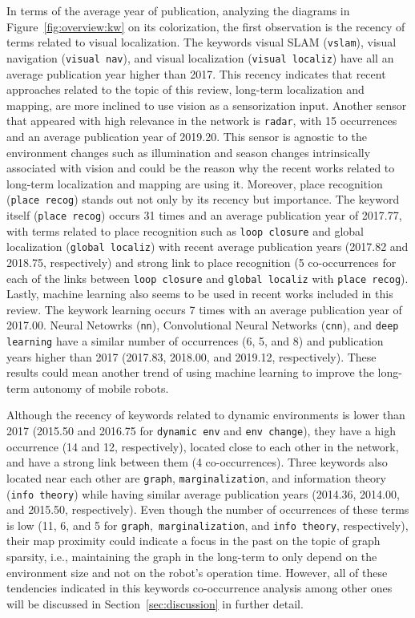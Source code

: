 In terms of the average year of publication, analyzing the diagrams in Figure~\ref{fig:overview:kw} on its colorization, the first observation is the recency of terms related to visual localization. The keywords visual SLAM (\texttt{vslam}), visual navigation (\texttt{visual nav}), and visual localization (\texttt{visual localiz}) have all an average publication year higher than 2017. This recency indicates that recent approaches related to the topic of this review, long-term localization and mapping, are more inclined to use vision as a sensorization input.
Another sensor that appeared with high relevance in the network is \texttt{radar}, with 15 occurrences and an average publication year of 2019.20. This sensor is agnostic to the environment changes such as illumination and season changes intrinsically associated with vision and could be the reason why the recent works related to long-term localization and mapping are using it.
Moreover, place recognition (\texttt{place recog}) stands out not only by its recency but importance. The keyword itself (\texttt{place recog}) occurs 31 times and an average publication year of 2017.77, with terms related to place recognition such as \texttt{loop closure} and global localization (\texttt{global localiz}) with recent average publication years (2017.82 and 2018.75, respectively) and strong link to place recognition (5 co-occurrences for each of the links between \texttt{loop closure} and \texttt{global localiz} with \texttt{place recog}). Lastly, machine learning also seems to be used in recent works included in this review. The keywork learning occurs 7 times with an average publication year of 2017.00. Neural Netowrks (\texttt{nn}), Convolutional Neural Networks (\texttt{cnn}), and \texttt{deep learning} have a similar number of occurrences (6, 5, and 8) and publication years higher than 2017 (2017.83, 2018.00, and 2019.12, respectively). These results could mean another trend of using machine learning to improve the long-term autonomy of mobile robots.

Although the recency of keywords related to dynamic environments is lower than 2017 (2015.50 and 2016.75 for \texttt{dynamic env} and \texttt{env change}), they have a high occurrence (14 and 12, respectively), located close to each other in the network, and have a strong link between them (4 co-occurrences). Three keywords also located near each other are \texttt{graph}, \texttt{marginalization}, and information theory (\texttt{info theory}) while having similar average publication years (2014.36, 2014.00, and 2015.50, respectively). Even though the number of occurrences of these terms is low (11, 6, and 5 for \texttt{graph},\texttt{ marginalization}, and \texttt{info theory}, respectively), their map proximity could indicate a focus in the past on the topic of graph sparsity, i.e., maintaining the graph in the long-term to only depend on the environment size and not on the robot's operation time. However, all of these tendencies indicated in this keywords co-occurrence analysis among other ones will be discussed in Section~\ref{sec:discussion} in further detail.


